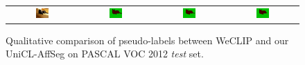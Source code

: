 \begin{figure}[ht]
\begin{tcolorbox}[colframe=black!60, colback=white, boxrule=0.8pt, arc=2pt, left=2pt, right=2pt, top=2pt, bottom=2pt]
\begin{tabular}{cccc}
      
      \includegraphics[width=0.20\textwidth,height=0.20\textwidth]
      {figures/originals/2010_002531}
                &
      \includegraphics[width=0.20\textwidth,height=0.20\textwidth]
      {figures/colored_gts/2010_002531}
                &
      \includegraphics[width=0.20\textwidth,height=0.20\textwidth]
      {figures/test_labels/weclip/2010_002531_[7, 17]}
                &
      \includegraphics[width=0.20\textwidth,height=0.20\textwidth]
      {figures/test_labels/ours/2010_002531_[7, 17]} \\


    \end{tabular}

    \caption{Qualitative comparison of pseudo-labels between WeCLIP and our UniCL-AffSeg on PASCAL VOC 2012 \textit{test} set.}
    \label{fig:qualitative_comparison_pseudolabel_test}
  \end{tcolorbox}
\end{figure}



